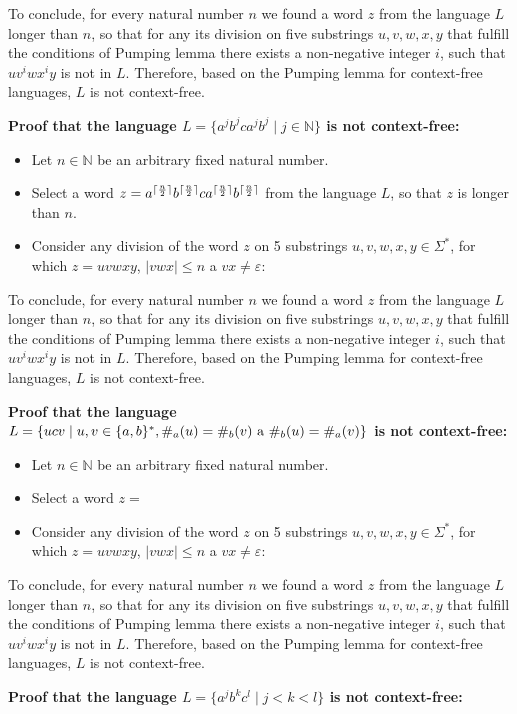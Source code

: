 \documentclass[12pt]{article}
\DeclarePairedDelimiter{\ceil}{\lceil}{\rceil}
\newcommand{\proofconclusion}{\vfill To conclude, for every natural number $n$ we found a word $z$ from the language $L$ longer than $n$, so that for any its division on five substrings $u, v, w, x, y$ that fulfill the conditions of Pumping lemma there exists a non-negative integer $i$, such that $uv^{i}wx^{i}y$ is not in $L$. Therefore, based on the Pumping lemma for context-free languages, $L$ is not context-free.}
\begin{document}
\proofconclusion

\newpage

\textbf{Proof that the language $L = \{ a^jb^jca^jb^j \mid j \in \mathbb{N} \}$ is not context-free:}

\begin{itemize}
    \item Let $n \in \mathbb{N}$ be an arbitrary fixed natural number.
    \item Select a word $z=a^{\ceil{\frac{n}{2}}}b^{\ceil{\frac{n}{2}}}ca^{\ceil{\frac{n}{2}}}b^{\ceil{\frac{n}{2}}}$ from the language $L$, so that $z$ is longer than $n$.
    \item Consider any division of the word $z$ on 5 substrings $u, v, w, x, y \in \Sigma^{*}$, for which $z=uvwxy$, $\lvert vwx \rvert \leq n$ a $vx \neq \varepsilon$:
\end{itemize}

\proofconclusion

\newpage

\textbf{Proof that the language $L = \{  ucv \mid u, v \in \{ a,b \}^{*}, \#_{a}(u) = \#_{b}(v) \textnormal{ a } \#_{b}(u) = \#_{a}(v) \}$ is not context-free:}

\begin{itemize}
    \item Let $n \in \mathbb{N}$ be an arbitrary fixed natural number.
    \item Select a word $z =$
    \item Consider any division of the word $z$ on 5 substrings $u, v, w, x, y \in \Sigma^{*}$, for which $z=uvwxy$, $\lvert vwx \rvert \leq n$ a $vx \neq \varepsilon$:
\end{itemize}

\proofconclusion

\newpage

\textbf{Proof that the language $L = \{  a^{j}b^{k}c^{l} \mid j < k < l \}$ is not context-free:}
\end{document}

